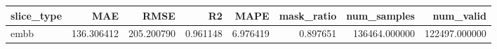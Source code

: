 \begin{tabular}{lrrrrrrr}
\toprule
slice_type & MAE & RMSE & R2 & MAPE & mask_ratio & num_samples & num_valid \\
\midrule
embb & 136.306412 & 205.200790 & 0.961148 & 6.976419 & 0.897651 & 136464.000000 & 122497.000000 \\
\bottomrule
\end{tabular}
